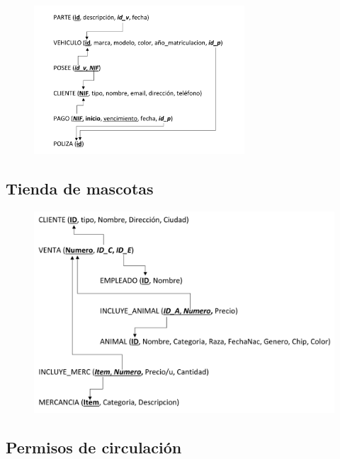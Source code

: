 \documentclass{db-practice}
\begin{document}
\begin{figure}[H]
    \includegraphics[width=0.7\textwidth]{figs/paso-a-tablas/comp-aseguradora-sol}
\end{figure}

\subsection{Tienda de mascotas}

\begin{figure}[H]
    \includegraphics[width=\textwidth]{figs/paso-a-tablas/tienda-de-mascotas-sol}
\end{figure}

\subsection{Permisos de circulación}
\end{document}
